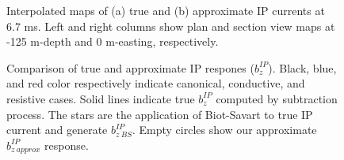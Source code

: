 \documentclass[extra,mreferee]{gji}
\begin{document}
\begin{figure}
  \caption{Interpolated maps of (a) true and (b) approximate IP currents at 6.7 ms. Left and right columns show plan and section view maps at -125 m-depth and 0 m-easting, respectively. }
  \label{F:IPcurrent_PlanandSec_late}
\end{figure}

\begin{figure}
  \caption{Comparison of true and approximate IP respones ($b_z^{IP}$). Black, blue, and red color respectively indicate canonical, conductive, and resistive cases. Solid lines indicate true $b_z^{IP}$ computed by subtraction process. The stars are the application of Biot-Savart to true IP current and generate $b_{z \ BS}^{IP}$. Empty circles show our approximate $b_{z \  approx}^{IP}$ response. }
  \label{F:True_vs_approx_IPresp}
\end{figure}
\end{document}
